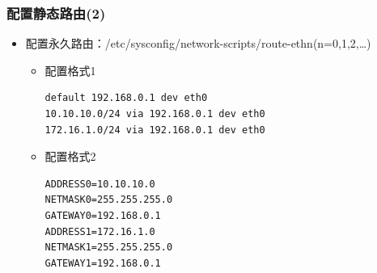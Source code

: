 \documentclass[xcolor=svgnames,presentation]{beamer}
\begin{document}
\begin{frame}[fragile]
\frametitle{配置静态路由(2)}
\label{sec-3-3}
\begin{itemize}

\item 配置永久路由：/etc/sysconfig/network-scripts/route-ethn(n=0,1,2,\ldots{})
\label{sec-3-3-1}%
\begin{itemize}

\item 配置格式1\\
\label{sec-3-3-1-1}%
\begin{verbatim}
default 192.168.0.1 dev eth0
10.10.10.0/24 via 192.168.0.1 dev eth0
172.16.1.0/24 via 192.168.0.1 dev eth0
\end{verbatim}

\item 配置格式2\\
\label{sec-3-3-1-2}%
\begin{verbatim}
ADDRESS0=10.10.10.0
NETMASK0=255.255.255.0
GATEWAY0=192.168.0.1
ADDRESS1=172.16.1.0
NETMASK1=255.255.255.0
GATEWAY1=192.168.0.1
\end{verbatim}
\end{itemize} %
\end{itemize} %
\end{frame}
\end{document}
